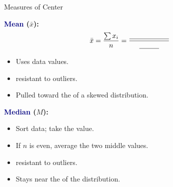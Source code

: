 \documentclass[10pt]{article}
\begin{document}
\vspace{0.08in}

\begin{notesbox}{Measures of Center}
\small
\begin{multicols}{2}

\textbf{\textcolor{navy}{Mean} ($\bar{x}$):}
\[\bar{x} = \frac{\sum x_i}{n} = \frac{\blank{2cm}}{\blank{1cm}}\]
\begin{itemize}[itemsep=3pt]
  \item Uses \blank{2.5cm} data values.
  \item \blank{2cm} resistant to outliers.
  \item Pulled toward the \blank{1.5cm} of a skewed distribution.
\end{itemize}

\columnbreak

\textbf{\textcolor{navy}{Median} ($M$):}
\begin{itemize}[itemsep=3pt]
  \item Sort data; take the \blank{2cm} value.
  \item If $n$ is even, average the \blank{2.5cm} two middle values.
  \item \blank{2.2cm} resistant to outliers.
  \item Stays near the \blank{2cm} of the distribution.
\end{itemize}
\end{multicols}
\end{notesbox}

\vspace{0.08in}
\end{document}
